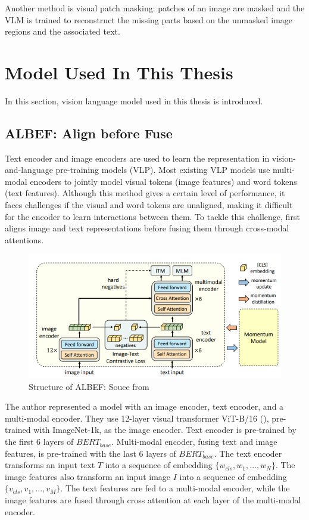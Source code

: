 Another method is visual patch masking: patches of an image are masked and the VLM is trained to reconstruct the missing parts based on the unmasked image regions and the associated text.

\section{Model Used In This Thesis}
In this section, vision language model used in this thesis is introduced.

\subsection{ALBEF: Align before Fuse}
Text encoder and image encoders are used to learn the representation in vision-and-language pre-training models (VLP). Most existing VLP models use multi-modal encoders to jointly model visual tokens (image features) and word tokens (text features). Although this method gives a certain level of performance, it faces challenges if the visual and word tokens are unaligned, making it difficult for the encoder to learn interactions between them. 
To tackle this challenge, \cite{li2021align} first aligns image and text representations before fusing them through cross-modal attentions. 

\begin{figure}[htbp]
    \begin{center}
        \includegraphics[width=\linewidth]{img/albef_model_structure.png}
        \caption{Structure of ALBEF: Souce from \cite{li2021align}}
        \label{fig:albef}
    \end{center}
\end{figure}

The author represented a model with an image encoder, text encoder, and a multi-modal encoder. They use 12-layer visual transformer ViT-B/16 (\cite{dosovitskiy2021image}), pre-trained with ImageNet-1k, as the image encoder. 
Text encoder is pre-trained by the first 6 layers of $BERT_{base}$. Multi-modal encoder, fusing text and image features, is pre-trained with the last 6 layers of $BERT_{base}$.
The text encoder transforms an input text $T$ into a sequence of embedding $\{w_{cls}, w_1, ..., w_N\}$. The image features also transform an input image $I$ into a sequence of embedding $\{v_{cls}, v_1, ..., v_M\}$. The text features are fed to a multi-modal encoder, while the image features are fused through cross attention at each layer of the multi-modal encoder.

